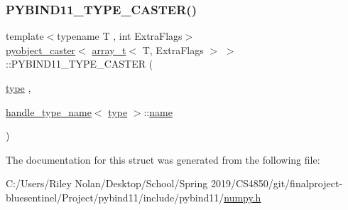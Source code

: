 \mbox{\label{structpyobject__caster_3_01array__t_3_01_t_00_01_extra_flags_01_4_01_4_a65398f53f654664d102b75c5818b515c}} 
\subsubsection{\texorpdfstring{PYBIND11\_TYPE\_CASTER()}{PYBIND11\_TYPE\_CASTER()}}
{\footnotesize\ttfamily template$<$typename T , int Extra\+Flags$>$ \\
\mbox{\hyperlink{structpyobject__caster}{pyobject\+\_\+caster}}$<$ \mbox{\hyperlink{classarray__t}{array\+\_\+t}}$<$ T, Extra\+Flags $>$ $>$\+::P\+Y\+B\+I\+N\+D11\+\_\+\+T\+Y\+P\+E\+\_\+\+C\+A\+S\+T\+ER (\begin{DoxyParamCaption}\item[{\mbox{\hyperlink{structpyobject__caster_3_01array__t_3_01_t_00_01_extra_flags_01_4_01_4_a05e8f86e245a6b880cd647b83c2fbd75}{type}}}]{,  }\item[{\mbox{\hyperlink{structhandle__type__name}{handle\+\_\+type\+\_\+name}}$<$ \mbox{\hyperlink{structpyobject__caster_3_01array__t_3_01_t_00_01_extra_flags_01_4_01_4_a05e8f86e245a6b880cd647b83c2fbd75}{type}} $>$\+::\mbox{\hyperlink{structname}{name}}}]{ }\end{DoxyParamCaption})}



The documentation for this struct was generated from the following file\+:\begin{DoxyCompactItemize}
\item 
C\+:/\+Users/\+Riley Nolan/\+Desktop/\+School/\+Spring 2019/\+C\+S4850/git/finalproject-\/bluesentinel/\+Project/pybind11/include/pybind11/\mbox{\hyperlink{numpy_8h}{numpy.\+h}}\end{DoxyCompactItemize}
